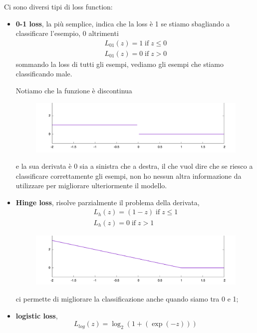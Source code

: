 Ci sono diversi tipi di loss function:
\begin{itemize}
    \item \textbf{0-1 loss}, la più semplice, indica che la loss è 1 se stiamo sbagliando a classificare l'esempio, 0 altrimenti
        \begin{equation}
        \begin{split}
            L_{01}(z)=1 \; \text{if} \; z\le 0 \\
            L_{01}(z)=0 \; \text{if} \; z> 0 
        \end{split}
        \end{equation}
        sommando la loss di tutti gli esempi, vediamo gli esempi che stiamo classificando male. 

        Notiamo che la funzione è discontinua
        \begin{figure}[!h]
            \centering
            \includegraphics[scale=0.5]{images/01loss.png}
            \label{fig:enter-label}
        \end{figure}
        e la sua derivata è 0 sia a sinistra che a destra, il che vuol dire che se riesco a classificare correttamente gli esempi, non ho nessun altra informazione da utilizzare per migliorare ulteriormente il modello.
    \item \textbf{Hinge loss}, risolve parzialmente il problema della derivata,  
    \begin{equation}
        \begin{split}
            L_{h}(z)=(1-z) \; \text{if} \; z\le 1 \\
            L_{h}(z)=0 \; \text{if}\;  z> 1 
        \end{split}
    \end{equation}
    
    \begin{figure}[!h]
        \centering
        \includegraphics[scale=0.5]{images/hingeLoss.png}
        \label{fig:enter-label}
    \end{figure}
    ci permette di migliorare la classificazione anche quando siamo tra 0 e 1;
    \newpage
    \item \textbf{logistic loss}, 
    \begin{equation}
        L_{log}(z)= \log_2(1+(\exp(-z)))
    \end{equation}
    

\end{itemize}
